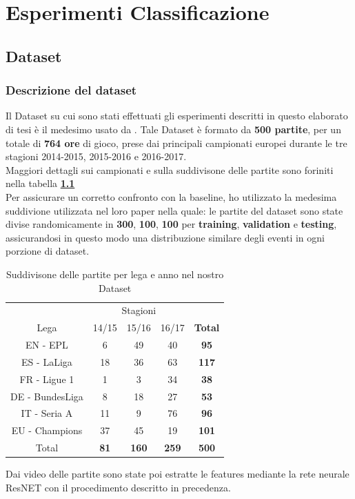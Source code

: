 \chapter{Esperimenti Classificazione}\label{ch:chapter2}
\section{Dataset}
\subsection{Descrizione del dataset }
Il Dataset su cui sono stati effettuati gli esperimenti descritti in questo elaborato di tesi è il medesimo usato da \citet{soccerNet}.
Tale Dataset è formato da \textbf{500 partite}, per un totale di \textbf{764 ore} di gioco, prese dai principali campionati europei durante le tre stagioni 2014-2015, 2015-2016 e 2016-2017.
\\Maggiori dettagli sui campionati e sulla suddivisone delle partite sono foriniti nella tabella \textbf{\ref{table: Dataset}}
\\Per assicurare un corretto confronto con la baseline, ho utilizzato la medesima suddivione utilizzata nel loro paper \cite{soccerNet} nella quale: le partite del dataset sono state divise randomicamente in \textbf{300}, \textbf{100}, \textbf{100} per \textbf{training}, \textbf{validation} e \textbf{testing}, assicurandosi in questo modo una distribuzione similare degli eventi in ogni porzione di dataset.
\begin{table}[H]
\caption{Suddivisone delle partite per lega e anno nel nostro Dataset}
\centering
\begin{tabular}{c| | c|c|c | | c}
\multicolumn{1}{c}{}&\multicolumn{3}{c}{Stagioni}& \\
Lega & 14/15 & 15/16 & 16/17 & \textbf{Total} \\
\hline
EN - EPL & 6 & 49 & 40 & \textbf{95} \\
ES - LaLiga & 18 & 36 & 63 & \textbf{117} \\
FR - Ligue 1 & 1 &  3 & 34 & \textbf{38} \\
DE - BundesLiga & 8 & 18 & 27 & \textbf{53} \\
IT - Seria A & 11 & 9 & 76 & \textbf{96} \\
EU - Champions & 37 & 45 & 19 & \textbf{101} \\
\hline
Total & \textbf{81} & \textbf{160} & \textbf{259} & \textbf{500} \\ [1ex]

\end{tabular}
\label{table: Dataset}
\end{table}
Dai video delle partite sono state poi estratte le features mediante la rete neurale ResNET con il procedimento descritto in precedenza.
